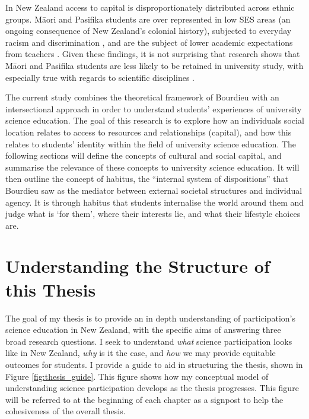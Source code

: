 In New Zealand access to capital is disproportionately distributed across ethnic groups. M\={a}ori and Pasifika students are over represented in low SES areas (an ongoing consequence of New Zealand's colonial history), subjected to everyday racism and discrimination \citep{mayeda2014you}, and are the subject of lower academic expectations from teachers \citep{turner2015teacher}. Given these findings, it is not surprising that research shows that M\={a}ori and Pasifika students are less likely to be retained in university study, with especially true with regards to scientific disciplines \cite{EducationCounts_2019}. 

The current study combines the theoretical framework of Bourdieu with an intersectional approach in order to understand students' experiences of university science education. The goal of this research is to explore how an individuals social location relates to access to resources and relationships (capital), and how this relates to students' identity within the field of university science education. The following sections will define the concepts of cultural and social capital, and summarise the relevance of these concepts to university science education. It will then outline the concept of habitus, the ``internal system of dispositions'' that Bourdieu saw as the mediator between external societal structures and individual agency. It is through habitus that students internalise the world around them and judge what is `for them', where their interests lie, and what their lifestyle choices are. 

\section{Understanding the Structure of this Thesis}
The goal of my thesis is to provide an in depth understanding of participation's science education in New Zealand, with the specific aims of answering three broad research questions.  I seek to understand \textit{what} science participation looks like in New Zealand, \textit{why} is it the case, and \textit{how} we may provide equitable outcomes for students. I provide a guide to aid in structuring the thesis, shown in Figure \ref{fig:thesis_guide}. This figure shows how my conceptual model of understanding science participation develops as the thesis progresses. This figure will be referred to at the beginning of each chapter as a signpost to help the cohesiveness of the overall thesis. 

